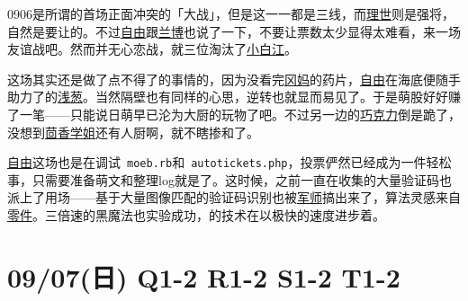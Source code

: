 
0906是所谓的首场正面冲突的「大战」，但是这一一都是三线，而\uline{理世}则是强将，自然是要让的。不过\uline{自由}跟\uline{兰博}也说了一下，不要让票数太少显得太难看，来一场友谊战吧。然而并无心恋战，就三位淘汰了\uline{小白江}。

这场其实还是做了点不得了的事情的，因为没看完\uline{冈妈}的药片，\uline{自由}在海底便随手助力了的\uline{浅葱}。当然隔壁也有同样的心思，逆转也就显而易见了。于是萌股好好赚了一笔——只能说日萌早已沦为大厨的玩物了吧。不过另一边的\uline{巧克力}倒是跪了，没想到\uline{茴香学姐}还有人厨啊，就不瞎掺和了。

\uline{自由}这场也是在调试~\verb=moeb.rb=和~\verb=autotickets.php=，投票俨然已经成为一件轻松事，只需要准备萌文和整理log就是了。这时候，之前一直在收集的大量验证码也派上了用场——基于大量图像匹配的验证码识别也被\uline{军师}搞出来了，算法灵感来自\uline{零件}。三倍速的黑魔法也实验成功，的技术在以极快的速度进步着。

\section{09/07(日) Q1-2 R1-2 S1-2 T1-2}


